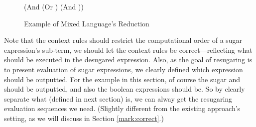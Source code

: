 \begin{figure}[thb]
\begin{center}
\begin{footnotesize}
\begin{Codes}
    (And (Or \true \false) (And \false \true))
\OneStep{ \false}
\end{Codes}
\end{footnotesize}
\end{center}
\caption{Example of Mixed Language's Reduction}
\label{fig:mixexec}
\end{figure}

Note that the context rules should restrict the computational order of a sugar expression's sub-term, we should let the context rules be correct---reflecting what should be executed in the desugared expression. Also, as the goal of resugaring is to present evaluation of sugar expressions, we clearly defined which expression should be outputted. For the example in this section, of course the sugar  and  should be outputted, and also the boolean expressions should be. So by clearly separate what  (defined in next section) is, we can alway get the resugaring evaluation sequences we need. (Slightly different from the existing approach's setting, as we will discuss in Section \ref{mark:correct}.)